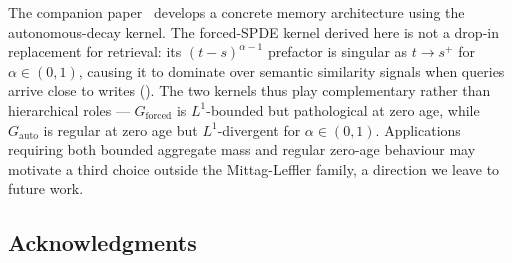 \documentclass[11pt]{article}
\theoremstyle{definition}
\theoremstyle{remark}
\begin{document}
The companion paper~\cite{fontes2026arch} develops
a concrete memory architecture using the
autonomous-decay kernel.  The forced-SPDE kernel
derived here is not a drop-in replacement for
retrieval: its $(t-s)^{\alpha-1}$ prefactor is
singular as $t \to s^+$ for $\alpha \in (0, 1)$,
causing it to dominate over semantic similarity
signals when queries arrive close to writes
().  The two kernels
thus play complementary rather than hierarchical
roles --- $G_{\mathrm{forced}}$ is $L^1$-bounded
but pathological at zero age, while
$G_{\mathrm{auto}}$ is regular at zero age but
$L^1$-divergent for $\alpha \in (0, 1)$.
Applications requiring both bounded aggregate mass
and regular zero-age behaviour may motivate a third
choice outside the Mittag-Leffler family, a
direction we leave to future work.

\subsection*{Acknowledgments}
\end{document}
